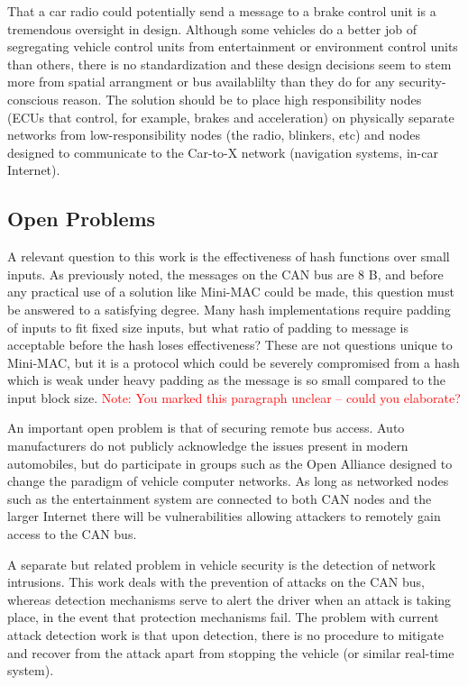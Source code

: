 That a car radio could potentially send a message to a brake control unit is a tremendous oversight in design. Although some vehicles do a better job of segregating vehicle control units from entertainment or environment control units than others, there is no standardization and these design decisions seem to stem more from spatial arrangment or bus availablilty than they do for any security-conscious reason. The solution should be to place high responsibility nodes (ECUs that control, for example, brakes and acceleration) on physically separate networks from low-responsibility nodes (the radio, blinkers, etc) and nodes designed to communicate to the Car-to-X network (navigation systems, in-car Internet).

\subsection{Open Problems}
\label{open}

A relevant question to this work is the effectiveness of hash functions over small inputs. As previously noted, the messages on the CAN bus are 8 B, and before any practical use of a solution like Mini-MAC could be made, this question must be answered to a satisfying degree. Many hash implementations require padding of inputs to fit fixed size inputs, but what ratio of padding to message is acceptable before the hash loses effectiveness? These are not questions unique to Mini-MAC, but it is a protocol which could be severely compromised from a hash which is weak under heavy padding as the message is so small compared to the input block size. \textcolor{red}{Note: You marked this paragraph unclear -- could you elaborate?}

An important open problem is that of securing remote bus access. Auto manufacturers do not publicly acknowledge the issues present in modern automobiles, but do participate in groups such as the Open Alliance designed to change the paradigm of vehicle computer networks. As long as networked nodes such as the entertainment system are connected to both CAN nodes and the larger Internet there will be vulnerabilities allowing attackers to remotely gain access to the CAN bus.

A separate but related problem in vehicle security is the detection of network intrusions. This work deals with the prevention of attacks on the CAN bus, whereas detection mechanisms serve to alert the driver when an attack is taking place, in the event that protection mechanisms fail. The problem with current attack detection work is that upon detection, there is no procedure to mitigate and recover from the attack apart from stopping the vehicle (or similar real-time system).

